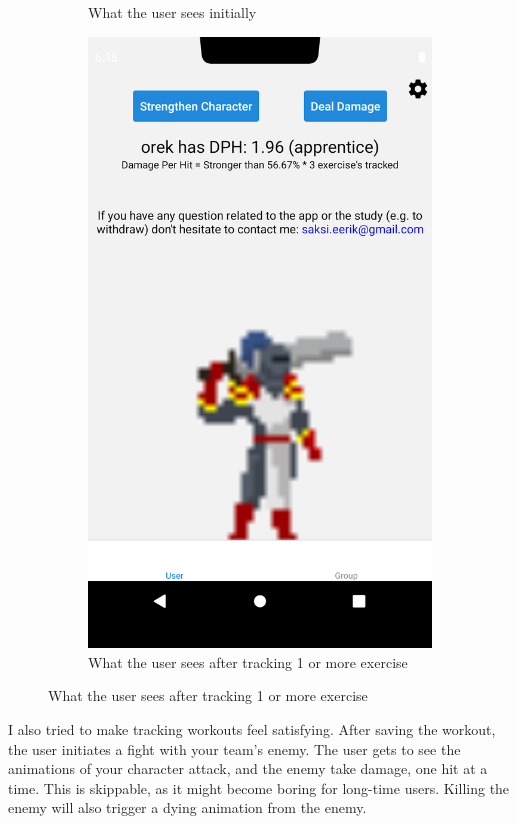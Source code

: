 \documentclass{l4proj}
\begin{document}
\begin{figure}[H]
\begin{subfigure}{0.45\textwidth}
      \caption{What the user sees initially}
    \end{subfigure}
    \begin{subfigure}{0.45\textwidth }
        \includegraphics[width=\textwidth]{apprentice.png}
        \caption{What the user sees after tracking 1 or more exercise} 
    \end{subfigure}
\end{figure}

\newpage
I also tried to make tracking workouts feel satisfying. After saving the workout, the user initiates a fight with your team's enemy. The user gets to see the animations of your character attack, and the enemy take damage, one hit at a time. This is skippable, as it might become boring for long-time users. Killing the enemy will also trigger a dying animation from the enemy.
\end{document}
